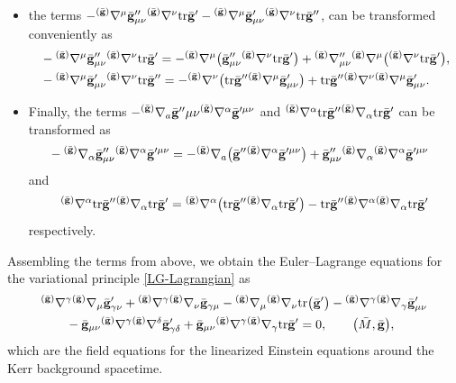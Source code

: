 \documentclass[pdftex]{sigma}
\def\grad{{\nabla}}%
\newcommand{\leftexp}[2]{{\vphantom{#2}}^{#1}{#2}}
\def \gm{\gamma}
\def \a{\alpha}
\renewcommand{\gg}{{\bf g}}
\newcommand{\bgg}{{\bar{\bf g}}}
\renewcommand{\a}{\alpha}
\renewcommand{\d}{\delta}
\numberwithin{equation}{section}
\begin{document}
\begin{itemize}
\item the terms $ - \leftexp{(\bar{\gg})}{\grad}^\mu \bgg''_{\mu \nu} \leftexp{(\bar{\gg})}{\grad}^\nu {\rm tr} \bgg' - \leftexp{(\bar{\gg})}{\grad}^\mu \bgg'_{\mu \nu} \leftexp{(\bar{\gg})}{\grad}^\nu {\rm tr} \bgg''$, can be transformed conveniently as
\begin{align*}
&- \leftexp{(\bar{\gg})}{\grad}^\mu \bgg''_{\mu \nu} \leftexp{(\bar{\gg})}{\grad}^\nu {\rm tr}\bgg'=
- \leftexp{(\bar{\gg})}{\grad}^\mu \bigl(\bgg''_{\mu \nu} \leftexp{(\bar{\gg})}{\grad}^\nu {\rm tr} \bgg'\bigr)
+ \leftexp{(\bar{\gg})}{\grad}''_{\mu \nu} \leftexp{(\bar{\gg})}{\grad}^\mu \bigl( \leftexp{(\bar{\gg})}{\grad}^\nu {\rm tr} \bgg'\bigr), \\
&- \leftexp{(\bar{\gg})}{\grad}^\mu \bgg'_{\mu \nu} \leftexp{(\bar{\gg})}{\grad}^\nu {\rm tr} \bgg''=
- \leftexp{(\bar{\gg})}{\grad}^\nu \bigl({\rm tr}\bgg'' \leftexp{(\bar{\gg})}{\grad}^\mu \bgg'_{\mu \nu}\bigr) +
{\rm tr}\bgg'' \leftexp{(\bar{\gg})}{\grad}^\nu \leftexp{(\bar{\gg})}{\grad}^\mu \bgg'_{ \mu \nu}.
\end{align*}

\item Finally, the terms $ - \leftexp{(\bar{\gg})}{\grad}_a \bgg''{\mu \nu} \leftexp{(\bar{\gg})}{\grad}^\a \bgg'^{ \mu \nu}$ and $ \leftexp{(\bar{\gg})}{\grad}^\a {\rm tr} \bgg'' \leftexp{(\bar{\gg})}{\grad}_\a {\rm tr} \bgg'$ can be transformed as
\begin{align*}
&-\leftexp{(\bar{\gg})}{\grad}_\a \bgg''_{\mu \nu} \leftexp{(\bar{\gg})}{\grad}^\a \bgg'^{\mu \nu}=
-\leftexp{(\bar{\gg})}{\grad}_a \bigl(\bgg'' \leftexp{(\bar{\gg})}{\grad}^\a \bgg'^{\mu \nu}\bigr) + \bgg''_{\mu \nu} \leftexp{(\bar{\gg})}{\grad}_\a \leftexp{(\bar{\gg})}{\grad}^\a \bgg'^{\mu \nu}
\end{align*}
and
\[
\leftexp{(\bar{\gg})}{\grad}^\a {\rm tr}\bgg'' \leftexp{(\bar{\gg})}{\grad}_\a {\rm tr} \bgg' = \leftexp{(\bar{\gg})}{\grad}^\a \bigl({\rm tr}\bgg'' \leftexp{(\bar{\gg})}{\grad}_\a {\rm tr}\bgg'\bigr) -
{\rm tr} \bgg'' \leftexp{(\bar{\gg})}{\grad}^\a \leftexp{(\bar{\gg})}{\grad}_\a {\rm tr} \bgg'
\]
respectively.
\end{itemize}
Assembling the terms from above, we obtain the Euler--Lagrange equations for the variational principle \eqref{LG-Lagrangian} as
\begin{align*}
&\leftexp{(\bar{\gg})}{\grad}^\gm \leftexp{(\bar{\gg})}{\grad}_\mu \bgg'_{\gm \nu} + \leftexp{(\bar{\gg})}{\grad}^\gm \leftexp{(\bar{\gg})}{\grad}_\nu \bgg_{\gm \mu} - \leftexp{(\bar{\gg})}{\grad}_\mu \leftexp{(\bar{\gg})}{\grad}_\nu {\rm tr}\bigl(\bgg'\bigr) - \leftexp{(\bar{\gg})}{\grad}^\gm \leftexp{(\bar{\gg})}{\grad}_\gm \bgg'_{ \mu \nu} \notag\\
&\qquad{}- \bgg_{\mu \nu}
\leftexp{(\bar{\gg})}{\grad}^\gm \leftexp{(\bar{\gg})}{\grad}^\d \bgg'_{ \gm \d} + \bgg_{\mu \nu}
\leftexp{(\bar{\gg})}{\grad}^\gm \leftexp{(\bar{\gg})}{\grad}_\gm {\rm tr} \bgg' =0, \qquad \bigl(\bar{M}, \bgg\bigr),
\end{align*}
which are the field equations for the linearized Einstein equations around the Kerr background spacetime.
\end{document}
